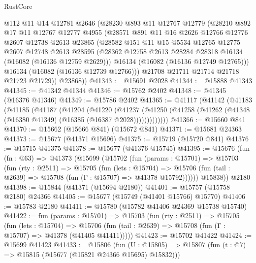 \begin{lexlean}{RustCore}
\begin{coremodule}
        @112
        @11
        @14
        @12781
        @2646
        (@28230
          @893
          @11
          @12767
          @12779
          (@28210
            @892
            @17
            @11
            @12767
            @12777
            @4955
            (@28571
              @891
              @11
              @16
              @2626
              @12766
              @12776
              @2607
              @12738
              @2613
              @23865
              (@28582
                @151
                @11
                @15
                @5534
                @12765
                @12775
                @2607
                @12748
                @2613
                @28595
                (@28362 @12758 @2613 @28284 @28318 @16134 (@16082 (@16136 @12759 @2629)))
                @16134
                (@16082 (@16136 @12749 @12765)))
              @16134
              (@16082 (@16136 @12739 @12766)))
            @21708
            @21711
            @21714
            @21718
            @21723
            @21729))
        @23868))
@41343 := @15691 @2028
@41344 := @15888 @41343
@41345 := @41342 @41344
@41346 := @15762 @2402
@41348 := @41345 (@16376 @41346)
@41349 := @15786 @2402
@41365 := @41117
    (@41142
      (@41183
        (@41185
          (@41187
            (@41204
              (@41220
                (@41237
                  (@41250 (@41258 (@41262 (@41348 (@16380 @41349) (@16385 (@16387 @2028)))))))))))))
@41366 := @15660 @841
@41370 := @15662 (@15666 @841) (@15672 @841)
@41371 := @15681 @24363
@41373 := @15677 (@41371 @15696)
@41375 := @15719 (@15720 @841)
@41376 := @15715 @41375
@41378 := @15677 (@41376 @15745)
@41395 := @15676
    (fun (fn : @63) =>
    @41373
      (@15699
        (@15702
          (fun (params : @15701) =>
          @15703
            (fun (rty : @2511) =>
            @15705
              (fun (lets : @15704) =>
              @15706 (fun (tail : @2639) => @15708 (fun (Γ : @15707) => @41378 @15792))))))
        @15838))
    @2180
@41398 := @15844 (@41371 (@15694 @2180))
@41401 := @15757 (@15758 @2180) @24366
@41405 := @15677 (@15749 (@41401 @15766) @15770)
@41406 := @15783 @2180
@41411 := @15780 (@15782 @41406 @24369 @15738 @15740)
@41422 := fun (params : @15701) =>
  @15703
    (fun (rty : @2511) =>
    @15705
      (fun (lets : @15704) =>
      @15706 (fun (tail : @2639) => @15708 (fun (Γ : @15707) => @41378 (@41405 @41411)))))
@41423 := @15702 @41422
@41424 := @15699 @41423
@41433 := @15806
    (fun (U : @15805) => @15807 (fun (t : @7) => @15815 (@15677 (@15821 @24366 @15695) @15832)))

\end{coremodule}
\end{lexlean}
